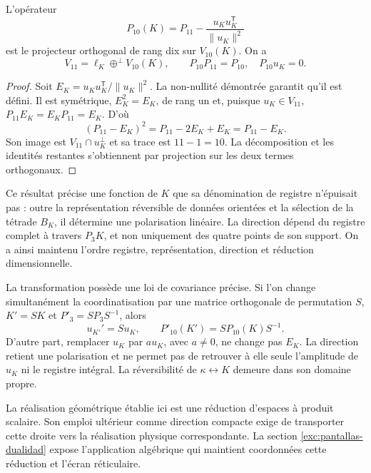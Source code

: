 \begin{proposition}
\label{prop:k-reduccion-diez}
L'opérateur
\begin{equation}
 P_{10}(K)=P_{11}
       -\frac{u_Ku_K^{\mathsf T}}{\lVert u_K\rVert^2}
 \label{eq:k-proyector-diez}
\end{equation}
est le projecteur orthogonal de rang dix sur \(V_{10}(K)\). On a
\[
 V_{11}=\ell_K\mathbin{\oplus^{\perp}}V_{10}(K),
 \qquad P_{10}P_{11}=P_{10},\quad P_{10}u_K=0.
\]
\end{proposition}
\begin{proof}
Soit \(E_K=u_Ku_K^{\mathsf T}/\lVert u_K\rVert^2\). La non-nullité démontrée garantit qu'il est défini. Il est symétrique, \(E_K^2=E_K\), de rang un et, puisque \(u_K\in V_{11}\), \(P_{11}E_K=E_KP_{11}=E_K\). D'où
\[
 (P_{11}-E_K)^2=P_{11}-2E_K+E_K=P_{11}-E_K.
\]
Son image est \(V_{11}\cap u_K^\perp\) et sa trace est
\(11-1=10\). La décomposition et les identités restantes
s'obtiennent par projection sur les deux termes orthogonaux.
\end{proof}

Ce résultat précise une fonction de \(K\) que sa dénomination de
registre n'épuisait pas : outre la représentation réversible de données
orientées et la sélection de la tétrade \(B_K\), il détermine une
polarisation linéaire. La direction dépend du registre complet à
travers \(P_3K\), et non uniquement des quatre points de son support.
On a ainsi maintenu l'ordre registre, représentation, direction et
réduction dimensionnelle.

La transformation possède une loi de covariance précise. Si l'on change
simultanément la coordinatisation par une matrice orthogonale de permutation \(S\),
\(K'=SK\) et \(P'_3=SP_3S^{-1}\), alors
\[
 u_{K'}'=Su_K,\qquad P'_{10}(K')=SP_{10}(K)S^{-1}.
\]
D'autre part, remplacer \(u_K\) par \(a u_K\), avec \(a\ne0\),
ne change pas \(E_K\). La direction retient une polarisation et ne
permet pas de retrouver à elle seule l'amplitude de \(u_K\) ni le
registre intégral. La réversibilité de \(\kappa\leftrightarrow K\)
demeure dans son domaine propre.

La réalisation géométrique établie ici est une réduction d'espaces à produit scalaire. Son emploi ultérieur comme direction compacte exige de transporter cette droite vers la réalisation physique correspondante. La section \ref{exc:pantallas-dualidad} expose l'application algébrique qui maintient coordonnées cette réduction et l'écran réticulaire.
